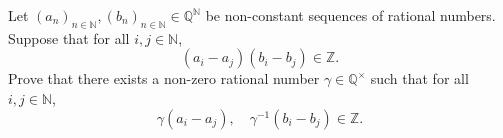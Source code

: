 \begin{problem}
    Let \( \left( a_n \right)_{n \in \mathbb{N}}, \left( b_n \right)_{n \in \mathbb{N}} \in \mathbb{Q}^{\mathbb{N}} \) be non-constant sequences of rational numbers. Suppose that for all \( i, j \in \mathbb{N} \),
    \[
        \left( a_i - a_j \right)\left( b_i - b_j \right) \in \mathbb{Z}.
    \]
    Prove that there exists a non-zero rational number \( \gamma \in \mathbb{Q}^{\times} \) such that for all \( i, j \in \mathbb{N} \),
    \[
        \gamma\left( a_i - a_j \right), \quad \gamma^{-1}\left( b_i - b_j \right) \in \mathbb{Z}.
    \]
\end{problem}
